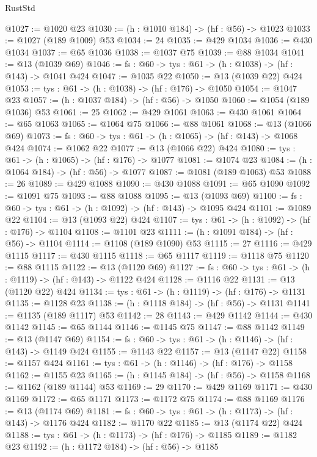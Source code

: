 \begin{lexlean}{RustStd}
\begin{coremodule}
@1027 := @1020 @23
@1030 := (h : @1010 @184) -> (hf : @56) -> @1023
@1033 := @1027 (@189 @1009) @53
@1034 := 24
@1035 := @429 @1034
@1036 := @430 @1034
@1037 := @65 @1036
@1038 := @1037 @75
@1039 := @88 @1034
@1041 := @13 (@1039 @69)
@1046 := {fs : @60} -> {tys : @61} -> (h : @1038) -> (hf : @143) -> @1041 @424
@1047 := @1035 @22
@1050 := @13 (@1039 @22) @424
@1053 := {tys : @61} -> (h : @1038) -> (hf : @176) -> @1050
@1054 := @1047 @23
@1057 := (h : @1037 @184) -> (hf : @56) -> @1050
@1060 := @1054 (@189 @1036) @53
@1061 := 25
@1062 := @429 @1061
@1063 := @430 @1061
@1064 := @65 @1063
@1065 := @1064 @75
@1066 := @88 @1061
@1068 := @13 (@1066 @69)
@1073 := {fs : @60} -> {tys : @61} -> (h : @1065) -> (hf : @143) -> @1068 @424
@1074 := @1062 @22
@1077 := @13 (@1066 @22) @424
@1080 := {tys : @61} -> (h : @1065) -> (hf : @176) -> @1077
@1081 := @1074 @23
@1084 := (h : @1064 @184) -> (hf : @56) -> @1077
@1087 := @1081 (@189 @1063) @53
@1088 := 26
@1089 := @429 @1088
@1090 := @430 @1088
@1091 := @65 @1090
@1092 := @1091 @75
@1093 := @88 @1088
@1095 := @13 (@1093 @69)
@1100 := {fs : @60} -> {tys : @61} -> (h : @1092) -> (hf : @143) -> @1095 @424
@1101 := @1089 @22
@1104 := @13 (@1093 @22) @424
@1107 := {tys : @61} -> (h : @1092) -> (hf : @176) -> @1104
@1108 := @1101 @23
@1111 := (h : @1091 @184) -> (hf : @56) -> @1104
@1114 := @1108 (@189 @1090) @53
@1115 := 27
@1116 := @429 @1115
@1117 := @430 @1115
@1118 := @65 @1117
@1119 := @1118 @75
@1120 := @88 @1115
@1122 := @13 (@1120 @69)
@1127 := {fs : @60} -> {tys : @61} -> (h : @1119) -> (hf : @143) -> @1122 @424
@1128 := @1116 @22
@1131 := @13 (@1120 @22) @424
@1134 := {tys : @61} -> (h : @1119) -> (hf : @176) -> @1131
@1135 := @1128 @23
@1138 := (h : @1118 @184) -> (hf : @56) -> @1131
@1141 := @1135 (@189 @1117) @53
@1142 := 28
@1143 := @429 @1142
@1144 := @430 @1142
@1145 := @65 @1144
@1146 := @1145 @75
@1147 := @88 @1142
@1149 := @13 (@1147 @69)
@1154 := {fs : @60} -> {tys : @61} -> (h : @1146) -> (hf : @143) -> @1149 @424
@1155 := @1143 @22
@1157 := @13 (@1147 @22)
@1158 := @1157 @424
@1161 := {tys : @61} -> (h : @1146) -> (hf : @176) -> @1158
@1162 := @1155 @23
@1165 := (h : @1145 @184) -> (hf : @56) -> @1158
@1168 := @1162 (@189 @1144) @53
@1169 := 29
@1170 := @429 @1169
@1171 := @430 @1169
@1172 := @65 @1171
@1173 := @1172 @75
@1174 := @88 @1169
@1176 := @13 (@1174 @69)
@1181 := {fs : @60} -> {tys : @61} -> (h : @1173) -> (hf : @143) -> @1176 @424
@1182 := @1170 @22
@1185 := @13 (@1174 @22) @424
@1188 := {tys : @61} -> (h : @1173) -> (hf : @176) -> @1185
@1189 := @1182 @23
@1192 := (h : @1172 @184) -> (hf : @56) -> @1185

\end{coremodule}
\end{lexlean}
